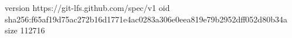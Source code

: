 version https://git-lfs.github.com/spec/v1
oid sha256:f65af19d75ac272b16d1771e4ac0283a306e0eea819e79b2952dff052d80b34a
size 112716
